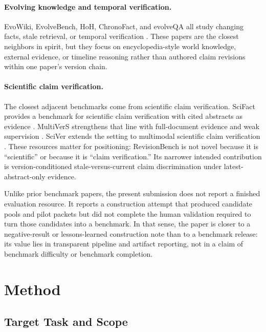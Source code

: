 \documentclass{article}
\begin{document}
\paragraph{Evolving knowledge and temporal verification.}
EvoWiki, EvolveBench, HoH, ChronoFact, and evolveQA all study changing facts, stale retrieval, or temporal verification \citep{Tang2025EvoWiki,Ouyang2025HoH,Zhu2025EvolveBench,Barik2025ChronoFact,Nakshatri2025When}. These papers are the closest neighbors in spirit, but they focus on encyclopedia-style world knowledge, external evidence, or timeline reasoning rather than authored claim revisions within one paper's version chain.

\paragraph{Scientific claim verification.}
The closest adjacent benchmarks come from scientific claim verification. SciFact provides a benchmark for scientific claim verification with cited abstracts as evidence \citep{Wadden2020SciFact}. MultiVerS strengthens that line with full-document evidence and weak supervision \citep{Wadden2022MultiVerS}. SciVer extends the setting to multimodal scientific claim verification \citep{Wang2025SciVer}. These resources matter for positioning: RevisionBench is not novel because it is ``scientific'' or because it is ``claim verification.'' Its narrower intended contribution is version-conditioned stale-versus-current claim discrimination under latest-abstract-only evidence.

Unlike prior benchmark papers, the present submission does not report a finished evaluation resource. It reports a construction attempt that produced candidate pools and pilot packets but did not complete the human validation required to turn those candidates into a benchmark. In that sense, the paper is closer to a negative-result or lessons-learned construction note than to a benchmark release: its value lies in transparent pipeline and artifact reporting, not in a claim of benchmark difficulty or benchmark completion.

\section{Method}
\label{sec:method}

\subsection{Target Task and Scope}
\end{document}
